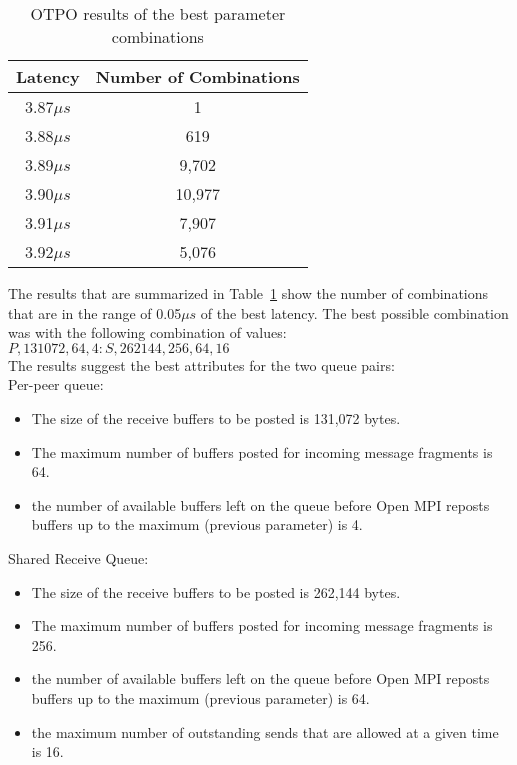 \begin{table}[tb]
\centering
\begin{tabular}{|c|c|} \hline
Latency & Number of Combinations \\
\hline
3.87$\mu s$  & 1\\
\hline
3.88$\mu s$  & 619\\
\hline
3.89$\mu s$  & 9,702\\
\hline
3.90$\mu s$  & 10,977\\
\hline
3.91$\mu s$  & 7,907\\
\hline
3.92$\mu s$  & 5,076\\
\hline
\end{tabular}  
\caption{OTPO results of the best parameter combinations}
\label{table:results} 
\end{table}

The results that are summarized in Table~\ref{table:results} show the
number of combinations that are in the range of 0.05$\mu s$ of the
best latency. The best possible combination was with the following
combination of values:
$P,131072,64,4:S,262144,256,64,16$\\
The results suggest the best attributes for the two queue pairs:\\
Per-peer queue:
\begin{itemize}
\item The size of the receive buffers to be posted is 131,072 bytes.
\item The maximum number of buffers posted for incoming message
  fragments is 64.
\item the number of available buffers left on the queue before Open
  MPI reposts buffers up to the maximum (previous parameter) is 4.
\end{itemize}
Shared Receive Queue:
\begin{itemize}
\item The size of the receive buffers to be posted is 262,144 bytes.
\item The maximum number of buffers posted for incoming message
  fragments is 256.
\item the number of available buffers left on the queue before Open
  MPI reposts buffers up to the maximum (previous parameter) is 64.
\item the maximum number of outstanding sends that are allowed at a
  given time is 16.
\end{itemize}

